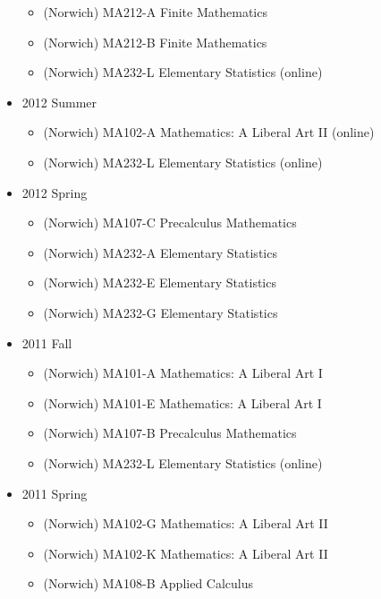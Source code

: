 \documentclass[a4paper]{adcv}
\begin{document}
\begin{itemize}
\begin{itemize}
      \item (Norwich) MA212-A Finite Mathematics
      \item (Norwich) MA212-B Finite Mathematics
      \item (Norwich) MA232-L Elementary Statistics (online)
    \end{itemize}
  \item
    2012 Summer
    \begin{itemize}
      \item (Norwich) MA102-A Mathematics: A Liberal Art II (online)
      \item (Norwich) MA232-L Elementary Statistics (online)
    \end{itemize}
  \item
    2012 Spring
    \begin{itemize}
      \item (Norwich) MA107-C Precalculus Mathematics
      \item (Norwich) MA232-A Elementary Statistics
      \item (Norwich) MA232-E Elementary Statistics
      \item (Norwich) MA232-G Elementary Statistics
    \end{itemize}
  \item
    2011 Fall
    \begin{itemize}
      \item (Norwich) MA101-A Mathematics: A Liberal Art I
      \item (Norwich) MA101-E Mathematics: A Liberal Art I
      \item (Norwich) MA107-B Precalculus Mathematics
      \item (Norwich) MA232-L Elementary Statistics (online)
    \end{itemize}
  \item
    2011 Spring
    \begin{itemize}
      \item (Norwich) MA102-G Mathematics: A Liberal Art II
      \item (Norwich) MA102-K Mathematics: A Liberal Art II
      \item (Norwich) MA108-B Applied Calculus
    \end{itemize}
\end{itemize}
\end{document}
